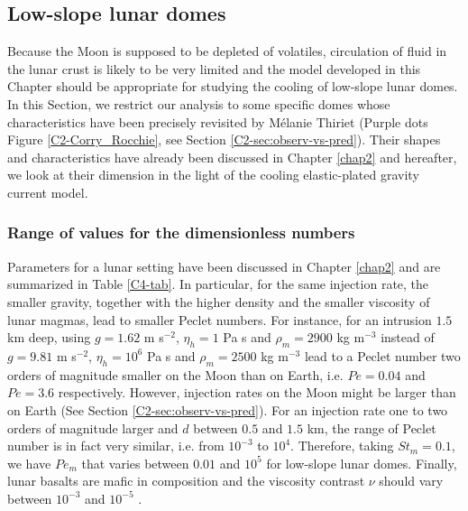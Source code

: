 \subsection{Low-slope lunar domes}
\label{sec:appl-arrest-terr-1}

Because the Moon is supposed  to be depleted of volatiles, circulation
of fluid in the lunar crust is likely to be very limited and the model
developed  in this  Chapter  should be  appropriate  for studying  the
cooling of  low-slope lunar domes.   In this Section, we  restrict our
analysis  to  some  specific  domes whose  characteristics  have  been
precisely   revisited  by   Mélanie   Thiriet   (Purple  dots   Figure
\ref{C2-Corry_Rocchie},   see  Section   \ref{C2-sec:observ-vs-pred}).
Their  shapes  and  characteristics  have already  been  discussed  in
Chapter \ref{chap2} and  hereafter, we look at their  dimension in the
light of the cooling elastic-plated gravity current model.

\subsubsection*{Range of values for the dimensionless numbers}
\label{C4-sec:range-valu-dimens}

Parameters  for  a  lunar  setting  have  been  discussed  in  Chapter
\ref{chap2} and are summarized  in Table \ref{C4-tab}.  In particular,
for the  same injection rate,  the smaller gravity, together  with the
higher  density and  the smaller  viscosity of  lunar magmas,  lead to
smaller Peclet numbers.  For instance, for an intrusion $1.5$ km deep,
using  $g=1.62$  m s$^{-2}$,  $\eta_h=1$  Pa  s and  $\rho_m=2900$  kg
m$^{-3}$  instead  of $g=9.81$  m  s$^{-2}$,  $\eta_h=10^6$ Pa  s  and
$\rho_m=2500$  kg m$^{-3}$  lead  to  a Peclet  number  two orders  of
magnitude  smaller on  the Moon  than  on Earth,  i.e.  $Pe=0.04$  and
$Pe=3.6$ respectively.  However, injection rates  on the Moon might be
larger  than   on  Earth   \citep{Crisp:1990gf,Zimbelman:1998ww}  (See
Section \ref{C2-sec:observ-vs-pred}).   For an  injection rate  one to
two orders of magnitude larger and $d$ between $0.5$ and $1.5$ km, the
range of Peclet  number is in fact very similar,  i.e.  from $10^{-3}$
to $10^4$.  Therefore,  taking $St_m=0.1$, we have  $Pe_m$ that varies
between $0.01$ and  $10^5$ for low-slope lunar  domes.  Finally, lunar
basalts  are mafic  in composition  and the  viscosity contrast  $\nu$
should vary between $10^{-3}$ and $10^{-5}$ \citep{Diniega:2013eh}.

